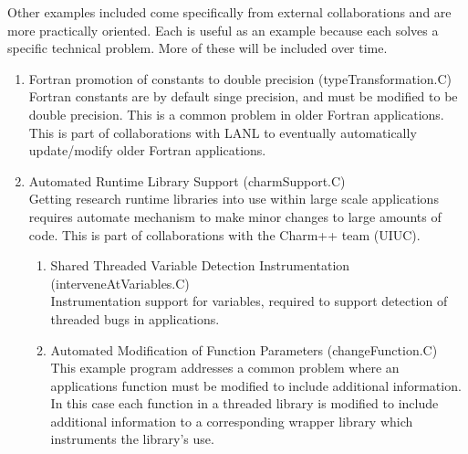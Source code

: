    Other examples included come specifically from external collaborations
and are more practically oriented.  Each is useful as an example because each 
solves a specific technical problem.  More of these will be included over time.
\begin{enumerate}
     \item Fortran promotion of constants to double precision (typeTransformation.C) \\
           Fortran constants are by default singe precision, and must be modified to
           be double precision.  This is a common problem in older Fortran applications.
           This is part of collaborations with LANL to eventually automatically 
           update/modify older Fortran applications.
     \item Automated Runtime Library Support (charmSupport.C) \\
           Getting research runtime libraries into use within large scale applications
           requires automate mechanism to make minor changes to large amounts of code.
           This is part of collaborations with the Charm++ team (UIUC).
     \begin{enumerate}
        \item Shared Threaded Variable Detection Instrumentation (interveneAtVariables.C) \\
              Instrumentation support for variables, required to support detection of 
              threaded bugs in applications.
        \item Automated Modification of Function Parameters (changeFunction.C) \\
              This example program addresses a common problem where an applications
              function must be modified to include additional information.  In this
              case each function in a threaded library is modified to include additional 
              information to a corresponding wrapper library which instruments the
              library's use.
     \end{enumerate}
\end{enumerate}


